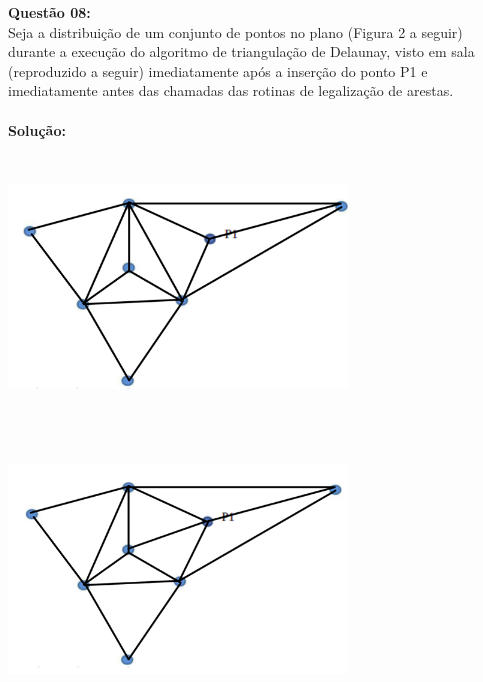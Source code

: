 \noindent\textbf{Questão 08:}\\
Seja a distribuição de um conjunto de pontos no plano (Figura 2 a seguir) durante a
execução do algoritmo de triangulação de Delaunay, visto em sala (reproduzido a seguir)
imediatamente após a inserção do ponto P1 e imediatamente antes das chamadas das
rotinas de legalização de arestas.\\
\\
\noindent\textbf{Solução:}\\
\noindent{}
\begin{center}
    \includegraphics[width=9cm,height=7cm]{img_04.png}
\end{center}
\noindent{}
\begin{center}
    \includegraphics[width=9cm,height=7cm]{img_05.png}
\end{center}
\vspace{1.0cm}


